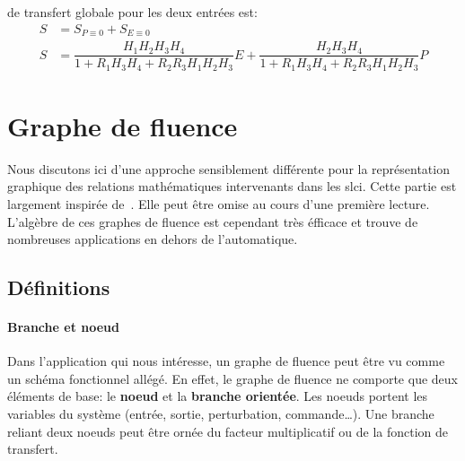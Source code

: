 de transfert globale pour les deux entrées est:
\begin{align*}
    S&=S_{P\equiv 0}+S_{E\equiv 0} \\
    S&=\dfrac{H_1H_2H_3H_4}{1+R_1H_3H_4+R_2R_3H_1H_2H_3} E + 
       \dfrac{H_2H_3H_4}{1+R_1H_3H_4+R_2R_3H_1H_2H_3} P 
\end{align*}
\section{Graphe de fluence}
Nous discutons ici d'une approche sensiblement différente 
pour la représentation graphique des relations mathématiques 
intervenants dans les \gls{slci}. Cette partie est largement
inspirée de~\cite{Ostertag}. Elle peut être omise au cours 
d'une première lecture. L'algèbre de ces graphes de fluence
est cependant très éfficace et trouve de nombreuses applications 
en dehors de l'automatique. 
\subsection{Définitions}
\paragraph{Branche et noeud}
Dans l'application qui nous intéresse, un graphe de fluence 
peut être vu comme un schéma fonctionnel allégé. En effet, le graphe de fluence 
ne comporte que deux éléments de base: le \textbf{noeud} et la 
\textbf{branche orientée}. Les noeuds portent les variables du système 
(entrée, sortie, perturbation, commande\ldots). 
Une branche reliant deux noeuds peut être ornée du facteur multiplicatif ou 
de la fonction de transfert.

